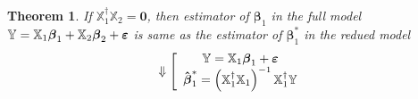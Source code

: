 \documentclass{article}
\newtheorem{theorem}{Theorem}
\begin{document}
\begin{theorem}
If $\mathbb{X}_{1}^{\dagger }\mathbb{X}_{2}=\boldsymbol{0}$, then estimator
of $\boldsymbol{\beta }_{1}$ in the full model $\mathbb{Y}=\mathbb{X}_{1}%
\boldsymbol{\beta }_{1}+\mathbb{X}_{2}\boldsymbol{\beta }_{2}+\boldsymbol{%
\varepsilon }$ is same as the estimator of $\boldsymbol{\beta }_{1}^{\ast }$
in the redued model%
\begin{equation*}
\Downarrow \left[ 
\begin{array}{c}
\mathbb{Y}=\mathbb{X}_{1}\boldsymbol{\beta }_{1}+\boldsymbol{\varepsilon }
\\ 
\boldsymbol{\hat{\beta}}_{1}^{\ast }=\left( \mathbb{X}_{1}^{\dagger }\mathbb{%
X}_{1}\right) ^{-1}\mathbb{X}_{1}^{\dagger }\mathbb{Y}%
\end{array}%
\right.
\end{equation*}


\end{theorem}
\end{document}
